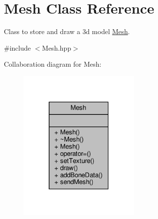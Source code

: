 \hypertarget{class_mesh}{}\section{Mesh Class Reference}
\label{class_mesh}


Class to store and draw a 3d model \hyperlink{class_mesh}{Mesh}.  




{\ttfamily \#include $<$Mesh.\+hpp$>$}



Collaboration diagram for Mesh\+:
\nopagebreak
\begin{figure}[H]
\begin{center}
\leavevmode
\includegraphics[width=171pt]{class_mesh__coll__graph}
\end{center}
\end{figure}
